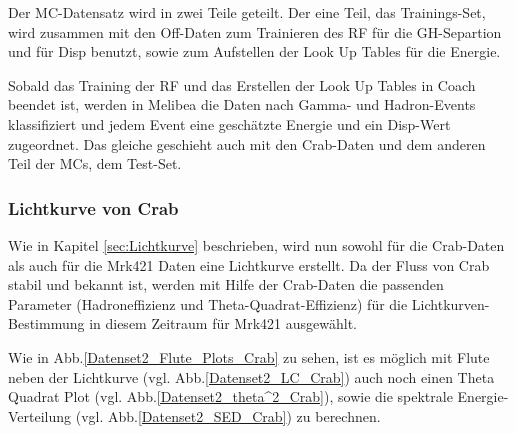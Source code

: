 Der MC-Datensatz wird in zwei Teile geteilt.
Der eine Teil, das Trainings-Set, wird zusammen mit den Off-Daten zum Trainieren des RF für die GH-Separtion und für Disp benutzt, sowie zum Aufstellen der Look Up Tables für die Energie.

Sobald das Training der RF und das Erstellen der Look Up Tables in Coach beendet ist, werden in Melibea die Daten nach Gamma- und Hadron-Events klassifiziert und jedem Event eine geschätzte Energie und ein Disp-Wert zugeordnet.
Das gleiche geschieht auch mit den Crab-Daten und dem anderen Teil der MCs, dem Test-Set.


\subsubsection{Lichtkurve von Crab}
Wie in Kapitel \ref{sec:Lichtkurve} beschrieben, wird nun sowohl für die Crab-Daten als auch für die Mrk421 Daten eine Lichtkurve erstellt.
Da der Fluss von Crab stabil und bekannt ist, werden mit Hilfe der Crab-Daten die passenden Parameter (Hadroneffizienz und Theta-Quadrat-Effizienz) für die Lichtkurven-Bestimmung in diesem Zeitraum für Mrk421 ausgewählt.

Wie in Abb.\ref{Datenset2_Flute_Plots_Crab} zu sehen, ist es möglich mit Flute neben der Lichtkurve (vgl. Abb.\ref{Datenset2_LC_Crab}) auch noch einen Theta Quadrat Plot (vgl. Abb.\ref{Datenset2_theta^2_Crab}), sowie die spektrale Energie-Verteilung (vgl. Abb.\ref{Datenset2_SED_Crab}) zu berechnen.

